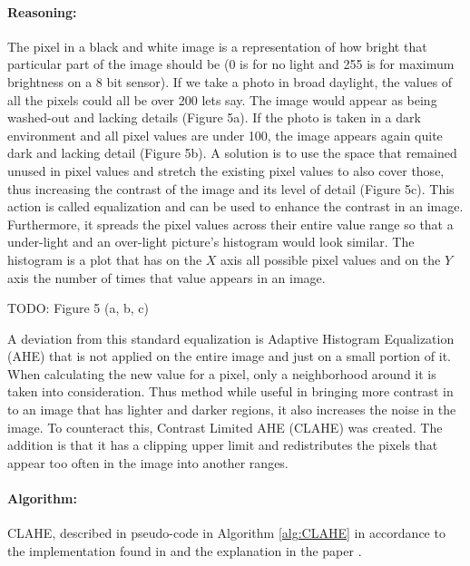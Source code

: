 \paragraph*{Reasoning:}\mbox{}\par
The pixel in a black and white image is a representation of how bright that particular part of the image should be (0 is for no light and 255 is for maximum brightness on a 8 bit sensor). If we take a photo in broad daylight, the values of all the pixels could all be over 200 lets say. The image would appear as being washed-out and lacking details (Figure 5a). If the photo is taken in a dark environment and all pixel values are under 100, the image appears again quite dark and lacking detail (Figure 5b). A solution is to use the space that remained unused in pixel values and stretch the existing pixel values to also cover those, thus increasing the contrast of the image and its level of detail (Figure 5c). This action is called equalization and can be used to enhance the contrast in an image. Furthermore, it spreads the pixel values across their entire value range so that a under-light and an over-light picture's histogram would look similar. The histogram is a plot that has on the $X$ axis all possible pixel values and on the $Y$ axis the number of times that value appears in an image.

TODO: Figure 5 (a, b, c)

A deviation from this standard equalization is Adaptive Histogram Equalization (AHE) that is not applied on the entire image and just on a small portion of it. When calculating the new value for a pixel, only a neighborhood around it is taken into consideration. Thus method while useful in bringing more contrast in to an image that has lighter and darker regions, it also increases the noise in the image. To counteract this, Contrast Limited AHE (CLAHE) was created. The addition is that it has a clipping upper limit and redistributes the pixels that appear too often in the image into another ranges.

\paragraph*{Algorithm:}\mbox{}\par

CLAHE, described in pseudo-code in Algorithm \ref{alg:CLAHE} in accordance to the implementation found in \cite{site:CLAHE_code} and the explanation in the paper \cite{article:CLAHE_explanation}.

